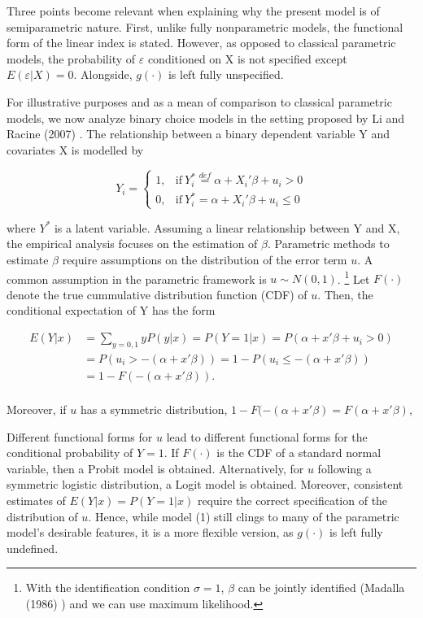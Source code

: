 \documentclass[a4paper]{article}
\begin{document}
Three points become relevant when explaining why the present model is of  semiparametric nature. First, unlike fully nonparametric models, the functional form of the linear index is stated. However, as opposed to classical parametric models, the probability of $\varepsilon$ conditioned on X is not specified except $ E(\varepsilon|X) = 0 $. Alongside, $g(\cdot)$ is left fully unspecified.

For illustrative purposes and as a mean of comparison to classical parametric models, we now analyze binary choice models in the setting proposed by Li and Racine (2007) \cite{[1]}. The relationship between a binary dependent variable Y and covariates X is modelled by

\[
    Y_i = 
    \begin{cases}
      1, & \text{if}\ Y_i^* \stackrel{def}{=} \alpha + X_i'\beta + u_i > 0 \\
      0, & \text{if}\ Y_i^* = \alpha + X_i'\beta + u_i \leq 0
    \end{cases}
\]

where $Y^{*}$ is a latent variable.
Assuming a linear relationship between Y and X, the empirical analysis focuses on the estimation of $\beta$.
Parametric methods to estimate $\beta$ require assumptions on the distribution of the error term $u$. A common assumption in the parametric framework is $ u \sim N(0, 1)$. \footnote{With the identification condition $\sigma = 1$, $\beta$ can be jointly identified (Madalla (1986) \cite{[2]}) and we can use maximum likelihood.}  Let $F(\cdot)$ denote the true cummulative distribution function (CDF) of $u$. Then, the conditional expectation of Y has the form

\[ 
\begin{split}
E(Y|x) & = \sum_{y=0,1} yP(y|x) = P(Y=1|x) = P(\alpha + x'\beta + u_i > 0) \\
 & = P(u_i > -(\alpha + x'\beta)) = 1 - P(u_i \leq -(\alpha + x'\beta)) \\
 & = 1 - F(-(\alpha + x'\beta)). \\
\end{split}
\]


Moreover, if $u$ has a symmetric distribution, $1 - F(-(\alpha + x'\beta) = F(\alpha + x'\beta)$, 

Different functional forms for $u$ lead to different functional forms for the conditional probability of $Y = 1$. If $F(\cdot)$ is the CDF of a standard normal variable, then a Probit model is obtained. Alternatively, for $u$ following a symmetric logistic distribution, a Logit model is obtained. Moreover, consistent estimates of $E(Y|x)=P(Y=1|x)$ require the correct specification of the distribution of $u$. 
Hence, while model (1) still clings to many of the parametric model's desirable features, it is a more flexible version, as $g(\cdot)$ is left fully undefined.
\end{document}
